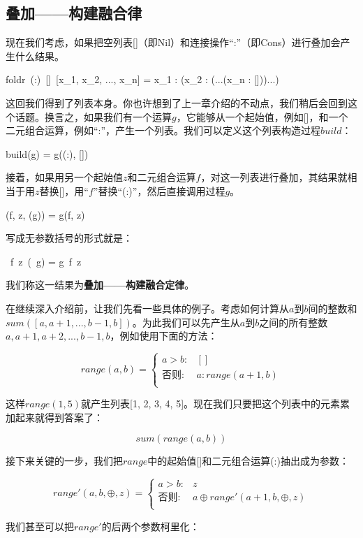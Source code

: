\documentclass[b5paper]{ctexart}
\begin{document}
\subsection{叠加——构建融合律}
现在我们考虑，如果把空列表[]（即Nil）和连接操作“:”（即Cons）进行叠加会产生什么结果。

\be
foldr\ (:)\ []\ [x_1, x_2, ..., x_n] = x_1 : (x_2 : (...(x_n : []))...)
\label{eq:foldr-fixed-point}
\ee

这回我们得到了列表本身。你也许想到了上一章介绍的不动点，我们稍后会回到这个话题。换言之，如果我们有一个运算$g$，它能够从一个起始值，例如[]，和一个二元组合运算，例如“:”，产生一个列表。我们可以定义这个列表构造过程$build$：

\be
build(g) = g((:), [])
\label{eq:build-definition}
\ee

接着，如果用另一个起始值$z$和二元组合运算$f$，对这一列表进行叠加，其结果就相当于用$z$替换[]，用“$f$”替换“(:)”，然后直接调用过程$g$。

\be
{}(f, z, (g)) = g(f, z)
\ee

写成无参数括号的形式就是：

\be
{}\ f\ z\ (\ g) = g\ f\ z
\label{eq:foldr-build-fusion-law}
\ee

我们称这一结果为\textbf{叠加——构建融合定律}。

在继续深入介绍前，让我们先看一些具体的例子。考虑如何计算从$a$到$b$间的整数和$sum([a, a+1, ..., b-1, b])$。为此我们可以先产生从$a$到$b$之间的所有整数$a, a+1, a+2, ..., b-1, b$，例如使用下面的方法：

\[
range(a, b) =
\begin{cases}
a > b: & [] \\
\text{否则}: & a : range(a+1, b) \\
\end{cases}
\]

这样$range(1, 5)$就产生列表[1, 2, 3, 4, 5]。现在我们只要把这个列表中的元素累加起来就得到答案了：

\[
sum(range(a, b))
\]

接下来关键的一步，我们把$range$中的起始值[]和二元组合运算(:)抽出成为参数：

\[
range'(a, b, \oplus, z) =
  \begin{cases}
  a > b: & z \\
  \text{否则}: & a \oplus range'(a+1, b, \oplus, z) \\
  \end{cases}
\]

我们甚至可以把$range'$的后两个参数柯里化：
\end{document}
